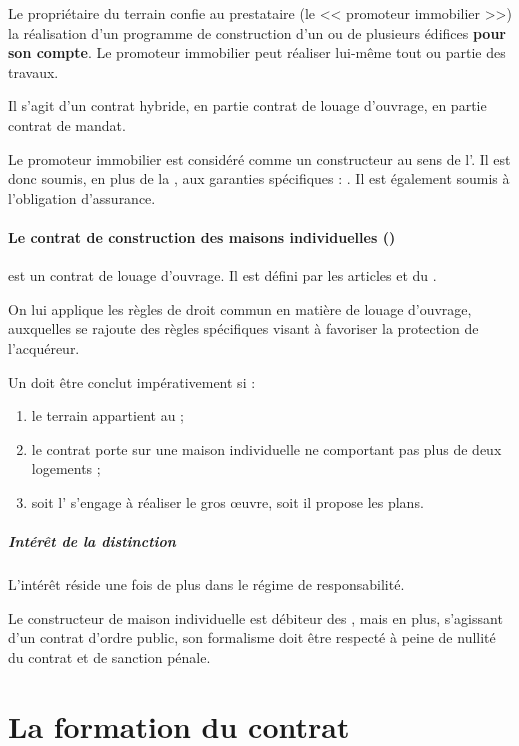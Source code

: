 				Le propriétaire du terrain confie au prestataire (le << promoteur immobilier >>) la réalisation d'un programme de construction d'un ou de plusieurs édifices \textbf{pour son compte}. Le promoteur immobilier peut réaliser lui-même tout ou partie des travaux.
				
				Il s'agit d'un contrat hybride, en partie contrat de louage d'ouvrage, en partie contrat de mandat.
				
				Le promoteur immobilier est considéré comme un constructeur au sens de l'. Il est donc soumis, en plus de la \rcdc, aux garanties spécifiques : \lesGarSpec. Il est également soumis à l'obligation d'assurance.
				
				\paragraph{Le contrat de construction des maisons individuelles (\CCMI)}
				
					est un contrat de louage d'ouvrage. Il est défini par les articles  et  du \cch.
					
					On lui applique les règles de droit commun en matière de louage d'ouvrage, auxquelles se rajoute des règles spécifiques visant à favoriser la protection de l'acquéreur.
					
					Un \ccmi{} doit être conclut impérativement si :
					\begin{enumerate}
						\item le terrain appartient au \Mo{} ;
						\item le contrat porte sur une maison individuelle ne comportant pas plus de deux logements ;
						\item soit l'\E{} s'engage à réaliser le gros œuvre, soit il propose les plans.
					\end{enumerate}
				
					\subparagraph{Intérêt de la distinction}
					
					L'intérêt réside une fois de plus dans le régime de responsabilité.
					
					Le constructeur de maison individuelle est débiteur des \garSpec{}, mais en plus, s'agissant d'un contrat d'ordre public, son formalisme doit être respecté à peine de nullité du contrat et de sanction pénale.
	
	\section{La formation du contrat}
	
